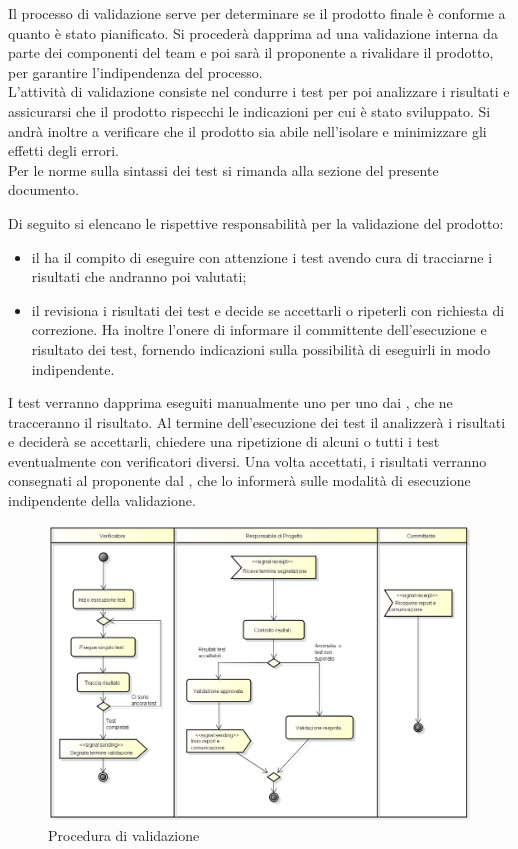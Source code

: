 Il processo di validazione serve per determinare se il prodotto finale è conforme a quanto è stato pianificato. Si procederà dapprima ad una validazione interna da parte dei componenti del team e poi sarà il proponente a rivalidare il prodotto, per garantire l’indipendenza del processo.\\
L’attività di validazione consiste nel condurre i test per poi analizzare i risultati e assicurarsi che il prodotto rispecchi le indicazioni per cui è stato sviluppato. Si andrà inoltre a verificare che il prodotto sia abile nell’isolare e minimizzare gli effetti degli errori.\\
Per le norme sulla sintassi dei test si rimanda alla sezione  del presente documento.

Di seguito si elencano le rispettive responsabilità per la validazione del prodotto:
\begin{itemize}
	\item il  ha il compito di eseguire con attenzione i test avendo cura di tracciarne i risultati che andranno poi valutati;
	\item il  revisiona i risultati dei test e decide se accettarli o ripeterli con richiesta di correzione. Ha inoltre l’onere di informare il committente dell’esecuzione e risultato dei test, fornendo indicazioni sulla possibilità di eseguirli in modo indipendente.
\end{itemize}
 

I test verranno dapprima eseguiti manualmente uno per uno dai , che ne tracceranno il risultato. Al termine dell’esecuzione dei test il  analizzerà i risultati e deciderà se accettarli, chiedere una ripetizione di alcuni o tutti i test eventualmente con verificatori diversi. Una volta accettati, i risultati verranno consegnati al proponente dal , che lo informerà sulle modalità di esecuzione indipendente della validazione.

\begin{figure}[H]
	\centering
	\includegraphics[width=\textwidth]{Pics/Validazione.png}
	\caption{Procedura di validazione}
\end{figure}
